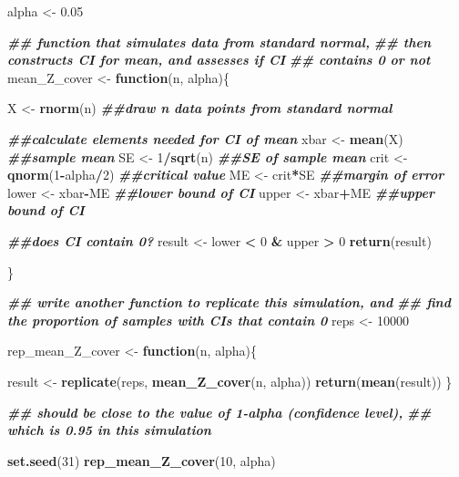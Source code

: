 \documentclass[
]{book}
\newenvironment{Shaded}{\begin{snugshade}}{\end{snugshade}}
\newcommand{\ControlFlowTok}[1]{\textcolor[rgb]{0.13,0.29,0.53}{\textbf{#1}}}
\newcommand{\DecValTok}[1]{\textcolor[rgb]{0.00,0.00,0.81}{#1}}
\newcommand{\DocumentationTok}[1]{\textcolor[rgb]{0.56,0.35,0.01}{\textbf{\textit{#1}}}}
\newcommand{\FloatTok}[1]{\textcolor[rgb]{0.00,0.00,0.81}{#1}}
\newcommand{\FunctionTok}[1]{\textcolor[rgb]{0.13,0.29,0.53}{\textbf{#1}}}
\newcommand{\NormalTok}[1]{#1}
\newcommand{\OtherTok}[1]{\textcolor[rgb]{0.56,0.35,0.01}{#1}}
\newcommand{\SpecialCharTok}[1]{\textcolor[rgb]{0.81,0.36,0.00}{\textbf{#1}}}
\theoremstyle{definition}
\theoremstyle{definition}
\theoremstyle{definition}
\theoremstyle{definition}
\theoremstyle{remark}
\begin{document}
\begin{Shaded}
\begin{Highlighting}[]
\NormalTok{alpha }\OtherTok{\textless{}{-}} \FloatTok{0.05}

\DocumentationTok{\#\# function that simulates data from standard normal,}
\DocumentationTok{\#\# then constructs CI for mean, and assesses if CI}
\DocumentationTok{\#\# contains 0 or not}
\NormalTok{mean\_Z\_cover }\OtherTok{\textless{}{-}} \ControlFlowTok{function}\NormalTok{(n, alpha)\{}
  
\NormalTok{  X }\OtherTok{\textless{}{-}} \FunctionTok{rnorm}\NormalTok{(n) }\DocumentationTok{\#\#draw n data points from standard normal}
  
  \DocumentationTok{\#\#calculate elements needed for CI of mean}
\NormalTok{  xbar }\OtherTok{\textless{}{-}} \FunctionTok{mean}\NormalTok{(X) }\DocumentationTok{\#\#sample mean}
\NormalTok{  SE }\OtherTok{\textless{}{-}} \DecValTok{1}\SpecialCharTok{/}\FunctionTok{sqrt}\NormalTok{(n) }\DocumentationTok{\#\#SE of sample mean}
\NormalTok{  crit }\OtherTok{\textless{}{-}} \FunctionTok{qnorm}\NormalTok{(}\DecValTok{1}\SpecialCharTok{{-}}\NormalTok{alpha}\SpecialCharTok{/}\DecValTok{2}\NormalTok{) }\DocumentationTok{\#\#critical value}
\NormalTok{  ME }\OtherTok{\textless{}{-}}\NormalTok{ crit}\SpecialCharTok{*}\NormalTok{SE }\DocumentationTok{\#\#margin of error}
\NormalTok{  lower }\OtherTok{\textless{}{-}}\NormalTok{ xbar}\SpecialCharTok{{-}}\NormalTok{ME }\DocumentationTok{\#\#lower bound of CI}
\NormalTok{  upper }\OtherTok{\textless{}{-}}\NormalTok{ xbar}\SpecialCharTok{+}\NormalTok{ME }\DocumentationTok{\#\#upper bound of CI}
  
  \DocumentationTok{\#\#does CI contain 0?}
\NormalTok{  result }\OtherTok{\textless{}{-}}\NormalTok{ lower }\SpecialCharTok{\textless{}} \DecValTok{0} \SpecialCharTok{\&}\NormalTok{ upper }\SpecialCharTok{\textgreater{}} \DecValTok{0}
  \FunctionTok{return}\NormalTok{(result)}
  
\NormalTok{\}}

\DocumentationTok{\#\# write another function to replicate this simulation, and}
\DocumentationTok{\#\# find the proportion of samples with CIs that contain 0}
\NormalTok{reps }\OtherTok{\textless{}{-}} \DecValTok{10000}

\NormalTok{rep\_mean\_Z\_cover }\OtherTok{\textless{}{-}} \ControlFlowTok{function}\NormalTok{(n, alpha)\{}
  
\NormalTok{  result }\OtherTok{\textless{}{-}} \FunctionTok{replicate}\NormalTok{(reps, }\FunctionTok{mean\_Z\_cover}\NormalTok{(n, alpha))}
  \FunctionTok{return}\NormalTok{(}\FunctionTok{mean}\NormalTok{(result))}
\NormalTok{\}}

\DocumentationTok{\#\# should be close to the value of 1{-}alpha (confidence level), }
\DocumentationTok{\#\# which is 0.95 in this simulation}

\FunctionTok{set.seed}\NormalTok{(}\DecValTok{31}\NormalTok{)}
\FunctionTok{rep\_mean\_Z\_cover}\NormalTok{(}\DecValTok{10}\NormalTok{, alpha)}
\end{Highlighting}
\end{Shaded}
\end{document}
